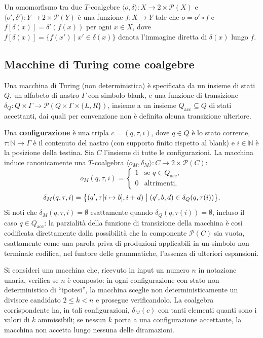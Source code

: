 Un omomorfismo tra due \(T\)-coalgebre \(\langle o, \delta \rangle : X \to 2 \times \mathcal{P}(X)\) e \(\langle o', \delta' \rangle : Y \to 2 \times \mathcal{P}(Y)\) è una funzione \(f : X \to Y\) tale che \(o = o' \circ f\) e \(f[\delta(x)] = \delta'(f(x))\) per ogni \(x \in X\), dove \(f[\delta(x)] = \{f(x') \mid x' \in \delta(x)\}\) denota l'immagine diretta di \(\delta(x)\) lungo \(f\).
 
\subsection{Macchine di Turing come coalgebre}
 
Una macchina di Turing (non deterministica) è specificata da un insieme di stati \(Q\), un alfabeto di nastro \(\Gamma\) con simbolo blank, e una funzione di transizione \(\delta_Q : Q \times \Gamma \to \mathcal{P}(Q \times \Gamma \times \{L, R\})\), insieme a un insieme \(Q_{\mathrm{acc}} \subseteq Q\) di stati accettanti, dai quali per convenzione non è definita alcuna transizione ulteriore.
 
Una \textbf{configurazione} è una tripla \(c = (q, \tau, i)\), dove \(q \in Q\) è lo stato corrente, \(\tau : \mathbb{N} \to \Gamma\) è il contenuto del nastro (con supporto finito rispetto al blank) e \(i \in \mathbb{N}\) è la posizione della testina. Sia \(C\) l'insieme di tutte le configurazioni. La macchina induce canonicamente una \(T\)-coalgebra \(\langle o_M, \delta_M \rangle : C \to 2 \times \mathcal{P}(C)\):
\[
  o_M(q, \tau, i) = \begin{cases} 1 & \text{se } q \in Q_{\mathrm{acc}}, \\ 0 & \text{altrimenti,} \end{cases}
\]
\[
  \delta_M(q, \tau, i) = \bigl\{ (q', \tau[i \mapsto b], i + d) \bigm| (q', b, d) \in \delta_Q(q, \tau(i)) \bigr\}.
\]
Si noti che \(\delta_M(q,\tau,i) = \emptyset\) esattamente quando \(\delta_Q(q, \tau(i)) = \emptyset\), incluso il caso \(q \in Q_{\mathrm{acc}}\): la parzialità della funzione di transizione della macchina è così codificata direttamente dalla possibilità che la componente \(\mathcal{P}(C)\) sia vuota, esattamente come una parola priva di produzioni applicabili in un simbolo non terminale codifica, nel funtore delle grammatiche, l'assenza di ulteriori espansioni.
 
\begin{example}
  Si consideri una macchina che, ricevuto in input un numero \(n\) in notazione unaria, verifica se \(n\) è composto: in ogni configurazione con stato non deterministico di ``ipotesi'', la macchina sceglie non deterministicamente un divisore candidato \(2 \leq k < n\) e prosegue verificandolo. La coalgebra corrispondente ha, in tali configurazioni, \(\delta_M(c)\) con tanti elementi quanti sono i valori di \(k\) ammissibili; se nessun \(k\) porta a una configurazione accettante, la macchina non accetta lungo nessuna delle diramazioni.
\end{example}
 
